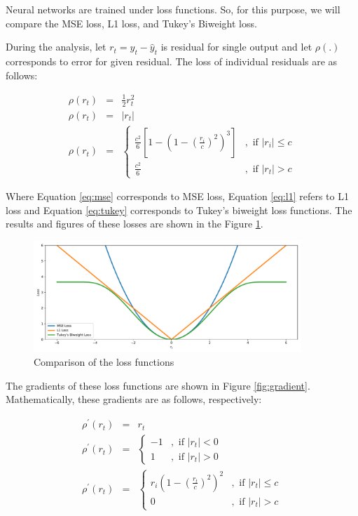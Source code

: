 Neural networks are trained under loss functions. So, for this purpose, we will compare the MSE loss, L1 loss, and Tukey's Biweight loss.

During the analysis, let $r_t = y_t - \hat{y}_t$ is residual for single output and let $\rho(.)$ corresponds to error for given residual. The loss of individual residuals are as follows:

\begin{eqnarray}
\rho(r_t) & = & \frac{1}{2} r_t^2 \label{eq:mse}\\
\rho(r_t) & = & \left|r_t\right| \label{eq:l1}\\
\rho(r_t) & = & \left\{\begin{array}{ll}{\frac{c^{2}}{6}\left[1-\left(1-\left(\frac{r_{i}}{c}\right)^{2}\right)^{3} \right]} & {, \text { if }\left|r_{i}\right| \leq c} \\ {\frac{c^{2}}{6}} & {, \text { if }\left|r_{t}\right|>c}\end{array}\right. \label{eq:tukey}
\end{eqnarray}

Where Equation \ref{eq:mse} corresponds to MSE loss, Equation \ref{eq:l1} refers to L1 loss and Equation \ref{eq:tukey} corresponds to Tukey's biweight loss functions. The results and figures of these losses are shown in the Figure \ref{fig:loss}.

\begin{figure}
    \centering
    \includegraphics[width=0.9\textwidth]{figures/loss.pdf}
    \caption{Comparison of the loss functions}
    \label{fig:loss}
\end{figure}

The gradients of these loss functions are shown in Figure \ref{fig:gradient}.
Mathematically, these gradients are as follows, respectively:

\begin{eqnarray}
\rho^{\prime}(r_t) & = & r_t \label{eq:mse-derivative}\\
\rho^{\prime}(r_t) & = & \left\{\begin{array}{ll}{-1} & {, \text { if }\left|r_{t}\right|<0} \\ {1} & {, \text { if }\left|r_{t}\right|>0}\end{array}\right. \label{eq:l1-derivative}\\
\rho^{\prime}(r_t) & = & \left\{\begin{array}{ll}{r_{i}\left(1-\left(\frac{r_{t}}{c}\right)^{2}\right)^{2}} & {, \text { if }\left|r_{t}\right| \leq c} \\ {0} & {, \text { if }\left|r_{t}\right|>c}\end{array}\right. \label{eq:tukey-derivative}
\end{eqnarray}

